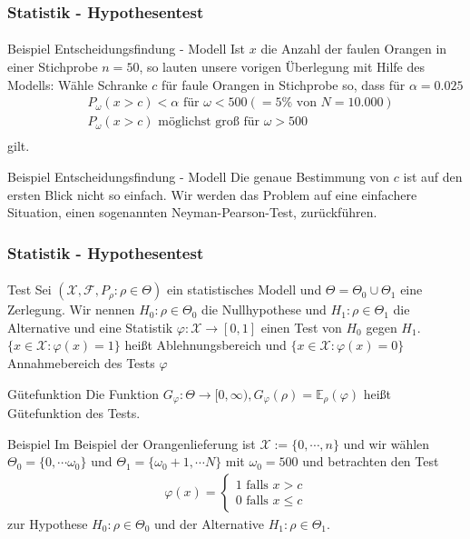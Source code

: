 \documentclass{beamer}
\begin{document}
\begin{frame}
    \frametitle{Statistik - Hypothesentest}
\framesubtitle{}
\begin{block}{Beispiel Entscheidungsfindung - Modell}
Ist $x$ die Anzahl der faulen Orangen in einer Stichprobe $n = 50$, so lauten unsere vorigen Überlegung mit Hilfe des Modells: Wähle Schranke $c$ für faule Orangen in Stichprobe so,  dass für $\alpha = 0.025$
\begin{align*}
& P_\omega( x >c) < \alpha  \text{ für } \omega < 500 (= 5 \% \text{ von } N = 10.000) \\
& P_\omega( x >c) \text{ möglichst groß für } \omega > 500\\
\end{align*}
gilt.
\end{block}

\begin{block}{Beispiel Entscheidungsfindung - Modell}
Die genaue Bestimmung von $c$ ist auf den ersten Blick nicht so einfach. Wir werden das Problem auf eine einfachere Situation, einen sogenannten Neyman-Pearson-Test, zurückführen. 
\end{block}


 \end{frame}


\begin{frame}
    \frametitle{Statistik - Hypothesentest}
\framesubtitle{}
\begin{block}{Test}
Sei   $(\mathcal{X}, \mathcal{F}, P_\rho :  \rho \in \Theta)$ ein statistisches Modell und $ \Theta =  \Theta_0 \cup  \Theta_1$ eine Zerlegung.  Wir nennen $H_0 : \rho \in \Theta_0$ die Nullhypothese und  $H_1 : \rho \in \Theta_1$ die Alternative 
und eine Statistik $\varphi: \mathcal{X} \to [0,1]$ einen Test von $H_0$ gegen $H_1$. $\{ x \in \mathcal{X}  : \varphi(x) = 1\}$ heißt Ablehnungsbereich und  $\{ x \in \mathcal{X}  : \varphi(x) = 0\}$   Annahmebereich des Tests $\varphi$
\end{block}
\begin{block}{Gütefunktion}
Die Funktion $G_{\varphi}: \Theta \to [0,\infty), G_{\varphi}(\rho) = \mathbb{E}_{\rho}(\varphi)$ heißt Gütefunktion des Tests.
\end{block}
 \end{frame}

\begin{frame}
\begin{block}{Beispiel}
Im Beispiel der Orangenlieferung  ist $\mathcal{X}:= \{0, \cdots, n \}$ und wir wählen $\Theta_0 = \{ 0, \cdots \omega_0 \}$ und $\Theta_1 = \{\omega_0 +1 , \cdots N \}$ mit $\omega_0 = 500$ und betrachten den Test
\begin{align*}
 \varphi(x) = \begin{cases} 1 \text{ falls } x > c \\ 0 \text{ falls } x \leq c  \end{cases}
\end{align*}
zur Hypothese $H_0: \rho \in \Theta_0$ und der Alternative $H_1: \rho \in \Theta_1$. 
\end{block}
 \end{frame}
\end{document}
